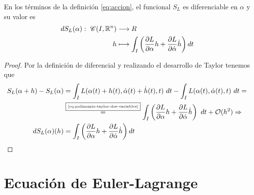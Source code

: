 \begin{theorem}
    En los términos de la definición \eqref{eq:accion}, el funcional $S_L$ es diferenciable en $\alpha$ y su valor es
    \begin{equation}
        \label{eq:accion_diferencial}
        \begin{align}
            dS_L(\alpha):\ \mathscr{C}(I, \mathbb{R}^n) & \longrightarrow R \\ h & \longmapsto \int_{I}\left( \frac{\partial L}{\partial\alpha}h+\frac{\partial L}{\partial\dot{\alpha}}\dot{h}\right) dt
        \end{align}
    \end{equation}
\end{theorem}
\begin{proof}
    Por la definición de diferencial y realizando el desarrollo de Taylor tenemos que
    \begin{equation*}
        \begin{split}
            S_L(\alpha + h) -  S_L(\alpha)& = \int_{I}L(\alpha(t)+h(t), \dot{\alpha}(t)+\dot{h}(t), t)\ dt - \int_{I}L(\alpha(t), \dot{\alpha}(t), t)\ dt =\\
            &\overset{\fbox{\tiny \ref{eq:polinomio-taylor-dos-variables}}}{=}\int_{I}\left( \frac{\partial L}{\partial\alpha}h+\frac{\partial L}{\partial\dot{\alpha}}\dot{h}\right)\ dt+\mathcal{O}(h^2)\Rightarrow\\
            dS_L(\alpha)(h) &=\int_{I}\left( \frac{\partial L}{\partial\alpha}h+\frac{\partial L}{\partial\dot{\alpha}}\dot{h}\right) dt
        \end{split}
    \end{equation*}
\end{proof}


\section{Ecuación de Euler-Lagrange}

